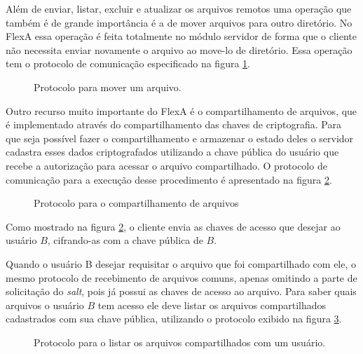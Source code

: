         Além de enviar, listar, excluir e atualizar os arquivos remotos uma operação que também é de grande importância é a de mover arquivos para outro diretório. No FlexA essa operação é feita totalmente no módulo servidor de forma que o cliente não necessita enviar novamente o arquivo ao move-lo de diretório. Essa operação tem o protocolo de comunicação especificado na figura \ref{fig:protMoveFile}.
        
        \begin{figure}[!ht]
        \caption{Protocolo para mover um arquivo.}
        \label{fig:protMoveFile}
        \end{figure}
        
        
        Outro recurso muito importante do FlexA é o compartilhamento de arquivos, que é implementado através do compartilhamento das chaves de criptografia. Para que seja possível fazer o compartilhamento e armazenar o estado deles o servidor cadastra esses dados criptografados utilizando a chave pública do usuário que recebe a autorização para acessar o arquivo compartilhado. O protocolo de comunicação para a execução desse procedimento é apresentado na figura \ref{fig:protShareFile}.
        
        \begin{figure}[!ht]
        \caption{Protocolo para o compartilhamento de arquivos}
        \label{fig:protShareFile}
        \end{figure}
        
        Como mostrado na figura \ref{fig:protShareFile}, o cliente envia as chaves de acesso que desejar ao usuário $B$, cifrando-as com a chave pública de $B$. 
        
        Quando o usuário B desejar requisitar o arquivo que foi compartilhado com ele, o mesmo protocolo de recebimento de arquivos comuns, apenas omitindo a parte de solicitação do \textit{salt}, pois já possui as chaves de acesso ao arquivo. Para saber quais arquivos o usuário $B$ tem acesso ele deve listar os arquivos compartilhados cadastrados com sua chave pública, utilizando o protocolo exibido na figura \ref{fig:protListSharedFiles}.
        
        
     \begin{figure}[!ht]
        \caption{Protocolo para o listar os arquivos compartilhados com um usuário.}
        \label{fig:protListSharedFiles}
        \end{figure}
        
